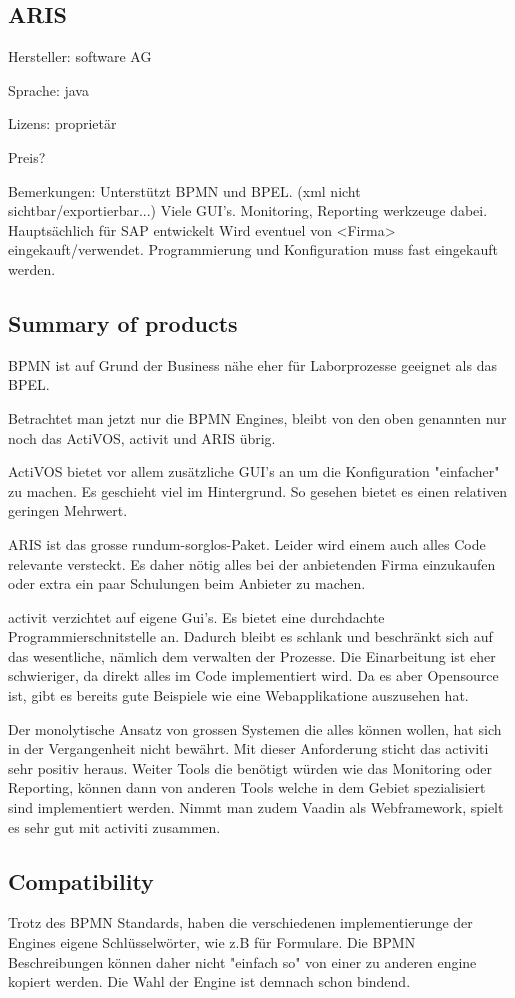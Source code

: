 \documentclass[paper=a4,twoside=false,BCOR=0mm,DIV=calc,fontsize=12pt]{scrartcl}
\begin{document}
\subsection{ARIS}
Hersteller: software AG

Sprache: java

Lizens: proprietär

Preis?

Bemerkungen:
Unterstützt BPMN und BPEL. (xml nicht sichtbar/exportierbar...)
Viele GUI's. 
Monitoring, Reporting werkzeuge dabei.
Hauptsächlich für SAP entwickelt
Wird eventuel von <Firma> eingekauft/verwendet.
Programmierung und Konfiguration muss fast eingekauft werden.



\subsection{Summary of products}
BPMN ist auf Grund der Business nähe eher für Laborprozesse geeignet als das BPEL.

Betrachtet man jetzt nur die BPMN Engines, bleibt von den oben genannten nur noch das ActiVOS, activit und ARIS übrig.

ActiVOS bietet vor allem zusätzliche GUI's an um die Konfiguration "einfacher" zu machen. Es geschieht viel im Hintergrund. 
So gesehen bietet es einen relativen geringen Mehrwert. 

ARIS ist das grosse rundum-sorglos-Paket. Leider wird einem auch alles Code relevante versteckt. Es daher nötig alles bei der anbietenden
Firma einzukaufen oder extra ein paar Schulungen beim Anbieter zu machen.

activit verzichtet auf eigene Gui's. Es bietet eine durchdachte Programmierschnitstelle an. Dadurch bleibt es schlank und beschränkt sich
auf das wesentliche, nämlich dem verwalten der Prozesse. Die Einarbeitung ist eher schwieriger, da direkt alles im Code implementiert wird.
Da es aber Opensource ist, gibt es bereits gute Beispiele wie eine Webapplikatione auszusehen hat.

Der monolytische Ansatz von grossen Systemen die alles können wollen, hat sich in der Vergangenheit nicht bewährt. Mit dieser Anforderung
sticht das activiti sehr positiv heraus. Weiter Tools die benötigt würden wie das Monitoring oder Reporting, können dann von anderen Tools
welche in dem Gebiet spezialisiert sind implementiert werden.
Nimmt man zudem Vaadin als Webframework, spielt es sehr gut mit activiti zusammen.


\subsection{Compatibility}
Trotz des BPMN Standards, haben die verschiedenen implementierunge der Engines eigene Schlüsselwörter, wie z.B für Formulare. 
Die BPMN Beschreibungen können daher nicht "einfach so" von einer zu anderen engine kopiert werden. 
Die Wahl der Engine ist demnach schon bindend.
\end{document}
